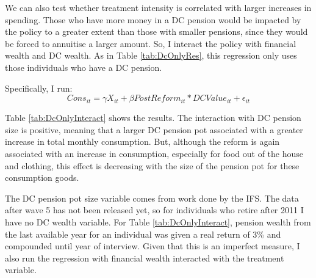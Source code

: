 \documentclass[12pt]{article}
\begin{document}
We can also test whether treatment intensity is correlated with larger increases
in spending. Those who have more money in a DC pension would be impacted by the
policy to a greater extent than those with smaller pensions, since they would be
forced to annuitise a larger amount. So, I interact the policy with financial
wealth and DC wealth. As in Table \ref{tab:DcOnlyRes}, this regression only uses
those individuals who have a DC pension.

Specifically, I run:
\begin{equation*}
    Cons_{it} =  \gamma X_{it} + \beta PostReform_{it}*DCValue_{it} + \epsilon_{it}
\end{equation*}


\begin{landscape}
    \linespread{1}

    
\end{landscape}

\begin{landscape}
    \linespread{1}

    
\end{landscape}

\begin{landscape}
    \linespread{1}

    
\end{landscape}

\begin{landscape}
    \linespread{1}
    
\end{landscape}

Table \ref{tab:DcOnlyInteract} shows the results. The interaction with DC
pension size is positive, meaning that a larger DC pension pot associated with a
greater increase in total monthly consumption. But, although the reform is again
associated with an increase in consumption, especially for food out of the house
and clothing, this effect is decreasing with the size of the pension pot for
these consumption goods.

The DC pension pot size variable comes from work done by the IFS. The data after
wave 5 has not been released yet, so for individuals who retire after 2011 I
have no DC wealth variable. For Table \ref{tab:DcOnlyInteract}, pension wealth
from the last available year for an individual was given a real return of 3\%
and compounded until year of interview. Given that this is an imperfect measure,
I also run the regression with financial wealth interacted with the treatment
variable.
\end{document}
